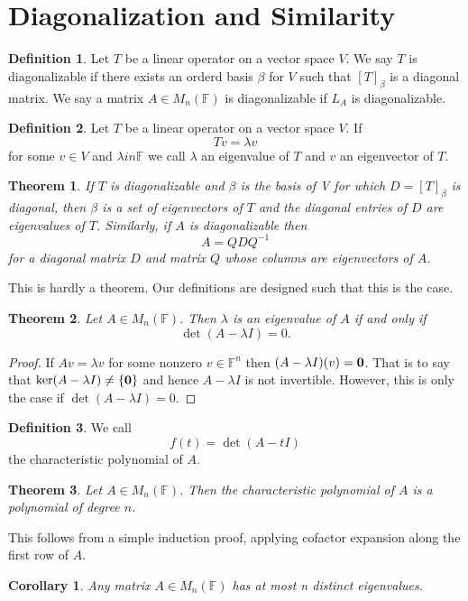 \documentclass[oneside, 12pt]{book}
\newtheorem{thm}{Theorem}[section]
\newtheorem{cor}{Corollary}[section]
\theoremstyle{definition}
\newtheorem{defn}{Definition}[section]
\begin{document}
\section{Diagonalization and Similarity}
\begin{defn}
  \label{defn_diagonalizable}
Let $T$ be a linear operator on a vector space $V$. We say $T$ is diagonalizable if there exists an orderd basis $\beta$ for $V$ such that $[T]_{\beta}$ is a diagonal matrix. We say a matrix $A \in M_{n}(\mathbb{F})$ is diagonalizable if $L_{A}$ is diagonalizable.
\end{defn}
\begin{defn}
  \label{denf_eigen}
Let $T$ be a linear operator on a vector space $V$. If \[Tv=\lambda v\] for some $v \in V$ and $\lambda in \mathbb{F}$ we call $\lambda$ an eigenvalue of $T$ and $v$ an eigenvector of $T$.
\end{defn}
\begin{thm}
If $T$ is diagonalizable and $\beta$ is the basis of V for which $D=[T]_{\beta}$ is diagonal, then $\beta$ is a set of eigenvectors of $T$ and the diagonal entries of $D$ are eigenvalues of $T$. Similarly, if $A$ is diagonalizable then \[A=QDQ^{-1}\] for a diagonal matrix $D$ and matrix $Q$ whose columns are eigenvectors of $A$.
\end{thm}
This is hardly a theorem. Our definitions are designed such that this is the case.
\begin{thm}
  \label{thm_eigendet}
Let $A \in M_{n}(\mathbb{F})$. Then $\lambda$ is an eigenvalue of $A$ if and only if \[\det(A-\lambda I)=0.\]
\end{thm}
\begin{proof}
If $Av=\lambda v$ for some nonzero $v \in \mathbb{F}^{n}$ then $(A-\lambda I)(v)=\bold{0}$. That is to say that $\ker(A-\lambda I)\neq \{\bold{0}\}$ and hence $A-\lambda I$ is not invertible. However, this is only the case if $\det(A- \lambda I)=0$.
\end{proof}
\begin{defn}
  \label{defn_charpol}
We call \[f(t)=\det(A- tI)\] the characteristic polynomial of $A$.
\end{defn}
\begin{thm}
  \label{thm_charpol}
Let $A \in M_{n}(\mathbb{F})$. Then the characteristic polynomial of $A$ is a polynomial of degree $n$.
\end{thm}
This follows from a simple induction proof, applying cofactor expansion along the first row of $A$.
\begin{cor}
Any matrix $A \in M_{n}(\mathbb{F})$ has at most n distinct eigenvalues.
\end{cor}
\end{document}

